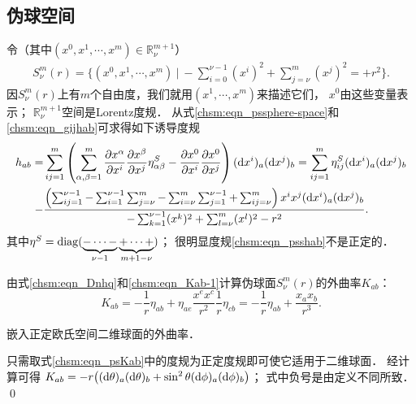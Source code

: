 
\subsection{伪球空间}\label{chsm:sec_pseudo-sphere}
令（其中$(x^0,x^1,\cdots,x^{m})\in \mathbb{R}^{m+1}_\nu$）
\begin{align}
    S^m_{\nu}(r) =  \bigl\{(x^0,x^1,\cdots,x^{m})\ |\  
    -\sum_{i=0}^{\nu-1} (x^i)^2+\sum_{j=\nu}^{m} (x^j)^2 = +r^2 \bigr\} . 
    \label{chsm:eqn_pssphere-space} 
\end{align} 
因$S^m_{\nu}(r)$上有$m$个自由度，我们就用$(x^1,\cdots,x^{m})$来描述它们，
$x^0$由这些变量表示；
$\mathbb{R}^{m+1}_\nu$空间是Lorentz度规．
从式\eqref{chsm:eqn_pssphere-space}和\eqref{chsm:eqn_gijhab}可求得如下诱导度规
\setlength{\mathindent}{0em}
\begin{align}
    h_{ab}=& \sum_{ij=1}^{m}\left(\sum_{\alpha,\beta=1}^{m}\frac{\partial x^\alpha}{\partial x^i}
    \frac{\partial x^\beta}{\partial x^j}\eta^S_{\alpha\beta} 
    -\frac{\partial x^0}{\partial x^i}  \frac{\partial x^0}{\partial x^j} \right) 
     ({\rm d} x^i)_a ({\rm d} x^j)_b  
    = \sum_{ij=1}^{m} \eta^S_{ij} ({\rm d} x^i)_a ({\rm d} x^j)_b  \notag \\
    -&\frac{ \left(\sum_{ij=1}^{\nu-1} - \sum_{i=1}^{\nu-1}\sum_{j=\nu}^{m}
     -\sum_{i=\nu}^{m}\sum_{j=1}^{\nu-1} +\sum_{ij=\nu}^{m} \right)
     x^i x^j({\rm d} x^i)_a ({\rm d} x^j)_b }
    {-\sum_{k=1}^{\nu-1}(x^k)^2+\sum_{l=\nu}^{m}(x^l)^2-r^2}  . \label{chsm:eqn_psshab}
\end{align}\setlength{\mathindent}{2em}
其中$\eta^S={\rm diag}(\underbrace{-\cdots-}_{\nu-1} \underbrace{+\cdots+}_{m+1-\nu})$；
很明显度规\eqref{chsm:eqn_psshab}不是正定的．

由式\eqref{chsm:eqn_Dnhq}和\eqref{chsm:eqn_Kab-1}计算伪球面$S^m_{\nu}(r)$的外曲率$K_{ab}$：
\begin{equation}\label{chsm:eqn_psKab}
    K_{ab} %
    =-\frac{1}{r}\eta_{ab}+
     \eta_{ae} \frac{x^e x^c}{r^2}  \frac{1}{r}\eta_{cb}
    =-\frac{1}{r}\eta_{ab}+ \frac{x_a x_b}{r^3} .
\end{equation}

\begin{example}
    嵌入正定欧氏空间二维球面的外曲率．
\end{example}
只需取式\eqref{chsm:eqn_psKab}中的度规为正定度规即可使它适用于二维球面．
经计算可得
$K_{ab}=-r\bigl(({\rm d}\theta)_a ({\rm d}\theta)_b + \sin^2\theta
({\rm d}\phi)_a({\rm d}\phi)_b\bigr)$；
式中负号是由定义不同所致．
\qed

